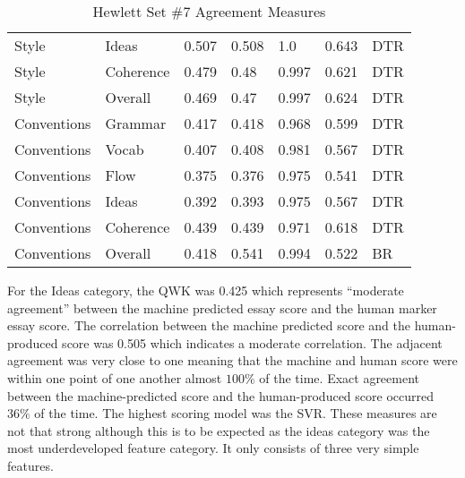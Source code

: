 \begin{table}[h]
\begin{tabular}{@{}lllllll@{}}
Style        & Ideas     & 0.507 & 0.508 & 1.0   & 0.643 & DTR   \\
Style        & Coherence & 0.479 & 0.48  & 0.997 & 0.621 & DTR   \\
Style        & Overall   & 0.469 & 0.47  & 0.997 & 0.624 & DTR   \\
Conventions  & Grammar   & 0.417 & 0.418 & 0.968 & 0.599 & DTR   \\
Conventions  & Vocab     & 0.407 & 0.408 & 0.981 & 0.567 & DTR   \\
Conventions  & Flow      & 0.375 & 0.376 & 0.975 & 0.541 & DTR   \\
Conventions  & Ideas     & 0.392 & 0.393 & 0.975 & 0.567 & DTR   \\
Conventions  & Coherence & 0.439 & 0.439 & 0.971 & 0.618 & DTR   \\
Conventions  & Overall   & 0.418 & 0.541 & 0.994 & 0.522 & BR    \\ \bottomrule
\end{tabular}
\caption{Hewlett Set \#7 Agreement Measures}
\end{table}

For the Ideas category, the QWK was 0.425 which represents “moderate agreement” between the machine predicted essay score and the human marker essay score. The correlation between the machine predicted score and the human-produced score was 0.505 which indicates a moderate correlation. The adjacent agreement was very close to one meaning that the machine and human score were within one point of one another almost $100\%$ of the time. Exact agreement between the machine-predicted score and the human-produced score occurred $36\%$ of the time. The highest scoring model was the SVR.
These measures are not that strong although this is to be expected as the ideas category was the most underdeveloped feature category. It only consists of three very simple features.



